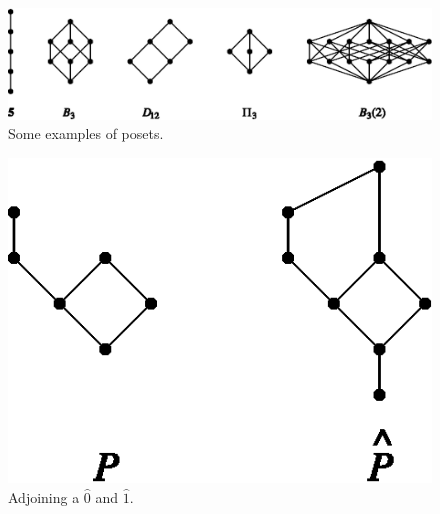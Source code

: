 \begin{figure}
	\centering
	\includegraphics[width=\textwidth]{fig/stanley/3-2}
	\caption{\label{fig:stanley:3-2} Some examples of posets. \cite{Stanley:2011:ECV:2124415}}
\end{figure}

\begin{figure}
	\centering
	\includegraphics[width=\textwidth]{fig/stanley/3-3}
	\caption{\label{fig:stanley:3-3} Adjoining a $\hat{0}$ and $\hat{1}$. \cite{Stanley:2011:ECV:2124415}}
\end{figure}